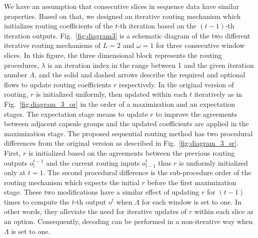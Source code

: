 \documentclass[review]{elsarticle}
\begin{document}
We have an assumption that consecutive slices in sequence data have similar properties.
Based on that, we designed an iterative routing mechanism which initializes routing coefficients of the $t$-th iteration based on the $(t-1)$-th iteration outputs.
Fig.~\ref{fig:diagram3} is a schematic diagram of the two different iterative routing mechanisms of $L=2$ and $\omega=1$ for three consecutive window slices.
In this figure, the three dimensional block represents the routing procedures, $\lambda$ is an iteration index in the range between 1 and the given iteration number $\Lambda$, and the solid and dashed arrows describe the required and optional flows to update routing coefficients $r$ respectively.
In the original version of routing, $r$ is initialized uniformly, then updated within each $t$ iteratively as in Fig.~\ref{fig:diagram_3_or} in the order of a maximization and an expectation stages.
The expectation stage means to update $r$ to improve the agreements between adjacent capsule groups and the updated coefficients are applied in the maximization stage.
The proposed sequential routing method has two procedural differences from the original version as described in Fig.~\ref{fig:diagram_3_sr}.
First, $r$ is initialized based on the agreements between the previous routing outputs $o_{l}^{t-1}$ and the current routing inputs $o_{l-1}^{t}$ thus $r$ is uniformly initialized only at $t=1$.
The second procedural difference is the sub-procedure order of the routing mechanism which expects the initial $r$ before the first maximization stage.
These two modifications have a similar effect of updating $r$ for $(t-1)$ times to compute the $t$-th output $o^t$ when $\Lambda$ for each window is set to one.
In other words, they alleviate the need for iterative updates of $r$ within each slice as an option.
Consequently, decoding can be performed in a non-iterative way when $\Lambda$ is set to one.
\end{document}

